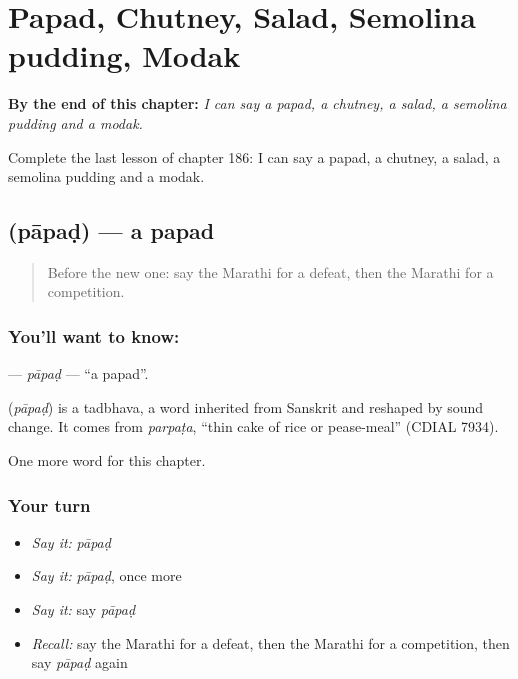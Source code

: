 
\chapter{Papad, Chutney, Salad, Semolina pudding, Modak}
\label{ch:mr-papad-chutney-salad-semolina-pudding-modak}

\begin{chapteropening}
\textbf{By the end of this chapter:} \emph{I can say a papad, a chutney, a salad, a semolina pudding and a modak.}

Complete the last lesson of chapter 186: I can say a papad, a chutney, a salad, a semolina pudding and a modak.
\end{chapteropening}

\section[\texorpdfstring{\mr{पापड} (pāpaḍ)}{पापड (pāpaḍ)}]{ (pāpaḍ) — a papad}

\label{lesson:MR-C186-papad}



\begin{quote}
Before the new one: say the Marathi for a defeat, then the Marathi for a competition.
\end{quote}

\subsection*{You'll want to know: }
\textbf{} — \emph{pāpaḍ} — \textquotedblleft{}a papad\textquotedblright{}.

\begin{cousinweb}
\textbf{} (\emph{pāpaḍ}) is a tadbhava, a word inherited from Sanskrit and reshaped by sound change. It comes from \emph{parpaṭa}, \textquotedblleft{}thin cake of rice or pease-meal\textquotedblright{} (CDIAL 7934).
\end{cousinweb}

\begin{grammarlens}[title={What you've built}]
One more word for this chapter.
\end{grammarlens}

\subsection*{Your turn}
\begin{itemize}
\raggedright
  \item \emph{Say it:} \emph{pāpaḍ}
  \item \emph{Say it:} \emph{pāpaḍ}, once more
  \item \emph{Say it:} say \emph{pāpaḍ}
  \item \emph{Recall:} say the Marathi for a defeat, then the Marathi for a competition, then say \emph{pāpaḍ} again
\end{itemize}

